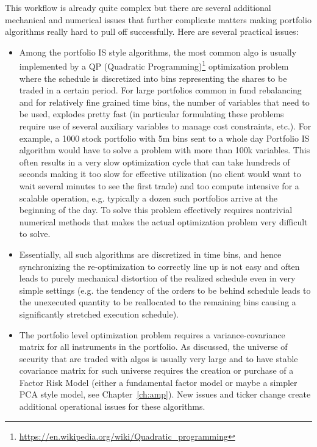 This workflow is already quite complex but there are several additional mechanical and numerical issues that further complicate matters making portfolio algorithms really hard to pull off successfully. Here are several practical issues:
\begin{itemize}
\item Among the portfolio IS style algorithms, the most common algo is usually implemented by a QP (Quadratic Programming)\footnote{\url{https://en.wikipedia.org/wiki/Quadratic_programming}} optimization problem where the schedule is discretized into bins representing the shares to be traded in a certain period. For large portfolios common in fund rebalancing and for relatively fine grained time bins, the number of variables that need to be used, explodes pretty fast (in particular formulating these problems require use of several auxiliary variables to manage cost constraints, etc.). For example, a 1000 stock portfolio with 5m bins  sent to a whole day Portfolio IS algorithm would have to solve a problem with more than 100k variables. This often results in a very slow  optimization cycle that can take hundreds of seconds making it too slow for effective utilization (no client would want to wait several minutes to see the first trade) and too compute intensive for a scalable operation, e.g. typically a dozen such portfolios arrive at the beginning of the day. To solve this problem effectively requires nontrivial numerical methods that makes the actual optimization problem very difficult to solve.

\item Essentially, all such algorithms are discretized in time bins, and hence synchronizing the re-optimization to correctly line up is not easy and often leads to purely mechanical distortion of the realized schedule even in very simple settings (e.g. the tendency of the orders to be behind schedule leads to the unexecuted quantity to be reallocated to the remaining bins causing a significantly stretched execution schedule).

\item The portfolio level optimization problem requires a variance-covariance matrix for all instruments in the portfolio. As discussed, the universe of security that are traded with algos is usually very large and to have stable covariance matrix for such universe requires the creation or purchase of a Factor Risk Model (either a fundamental factor model or maybe a simpler PCA style model, see Chapter~\ref{ch:amp}). New issues and ticker change create additional operational issues for these algorithms.


\end{itemize}

